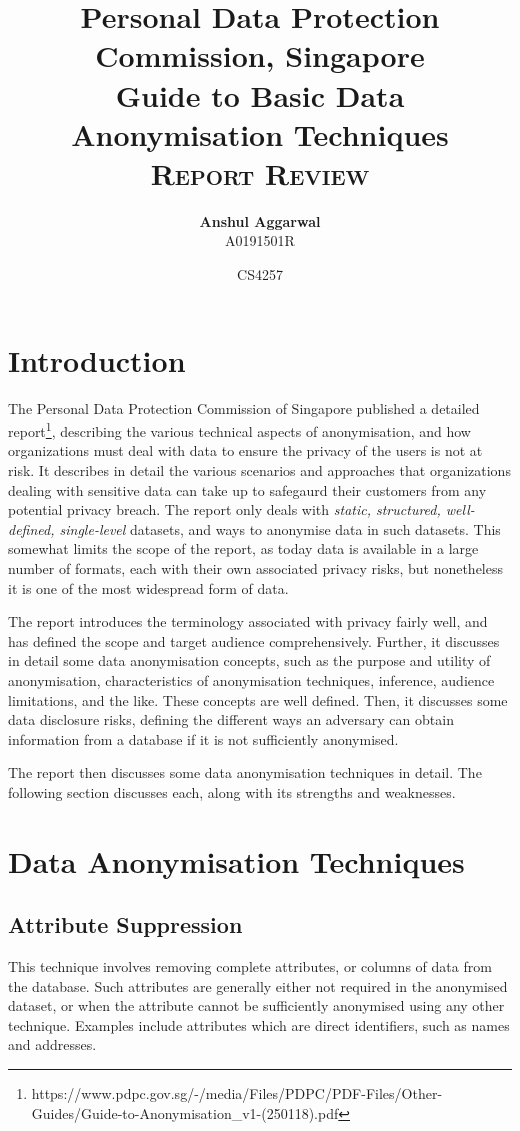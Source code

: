 \documentclass[11pt, a4paper]{article}
\title{\normalsize{Personal Data Protection Commission, Singapore}\\\LARGE{Guide to Basic Data Anonymisation Techniques}\\\vspace{0.3cm}\Large{{\textsc{Report Review}}}}
\author{\textbf{Anshul Aggarwal}\\A0191501R}
\date{CS4257}
\begin{document}
\maketitle

\section{Introduction}
The Personal Data Protection Commission of Singapore published a detailed report\footnote{https://www.pdpc.gov.sg/-/media/Files/PDPC/PDF-Files/Other-Guides/Guide-to-Anonymisation\_v1-(250118).pdf}, describing the various technical aspects of anonymisation, and how organizations must deal with data to ensure the privacy of the users is not at risk. It describes in detail the various scenarios and approaches that organizations dealing with sensitive data can take up to safegaurd their customers from any potential privacy breach. The report only deals with \textit{static, structured, well-defined, single-level} datasets, and ways to anonymise data in such datasets. This somewhat limits the scope of the report, as today data is available in a large number of formats, each with their own associated privacy risks, but nonetheless it is one of the most widespread form of data.


The report introduces the terminology associated with privacy fairly well, and has defined the scope and target audience comprehensively. Further, it discusses in detail some data anonymisation concepts, such as the purpose and utility of anonymisation, characteristics of anonymisation techniques, inference, audience limitations, and the like. These concepts are well defined. Then, it discusses some data disclosure risks, defining the different ways an adversary can obtain information from a database if it is not sufficiently anonymised.

The report then discusses some data anonymisation techniques in detail. The following section discusses each, along with its strengths and weaknesses.

\section{Data Anonymisation Techniques}

\subsection{Attribute Suppression}

This technique involves removing complete attributes, or columns of data from the database. Such attributes are generally either not required in the anonymised dataset, or when the attribute cannot be sufficiently anonymised using any other technique. Examples include attributes which are direct identifiers, such as names and addresses.
\end{document}
